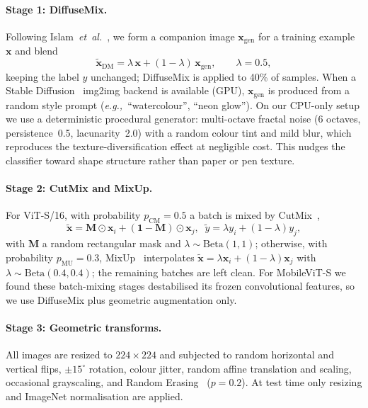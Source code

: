 \documentclass[10pt,twocolumn,letterpaper]{article}
\newcommand{\eg}{\textit{e.g.,}}
\newcommand{\etal}{\textit{et~al.}}
\begin{document}
\paragraph{Stage 1: DiffuseMix.}
Following Islam~\etal~\cite{diffusemix}, we form a companion image
$\mathbf{x}_{\text{gen}}$ for a training example $\mathbf{x}$ and blend
\begin{equation}
  \tilde{\mathbf{x}}_{\text{DM}} = \lambda\,\mathbf{x}
     + (1-\lambda)\,\mathbf{x}_{\text{gen}},\qquad \lambda=0.5,
  \label{eq:dm}
\end{equation}
keeping the label $y$ unchanged; DiffuseMix is applied to 40\% of samples.
When a Stable Diffusion~\cite{stablediffusion} img2img backend is available
(GPU), $\mathbf{x}_{\text{gen}}$ is produced from a random style prompt
(\eg\ ``watercolour'', ``neon glow''). On our CPU-only setup we use a
deterministic procedural generator: multi-octave fractal noise (6 octaves,
persistence~0.5, lacunarity~2.0) with a random colour tint and mild blur,
which reproduces the texture-diversification effect at negligible cost. This
nudges the classifier toward shape structure rather than paper or pen texture.

\paragraph{Stage 2: CutMix and MixUp.}
For ViT-S/16, with probability $p_{\text{CM}}=0.5$ a batch is mixed by
CutMix~\cite{cutmix},
\begin{equation}
  \tilde{\mathbf{x}} = \mathbf{M}\!\odot\!\mathbf{x}_i
      + (\mathbf{1}-\mathbf{M})\!\odot\!\mathbf{x}_j,\;\;
  \tilde{y}=\lambda y_i+(1-\lambda)y_j,
  \label{eq:cm}
\end{equation}
with $\mathbf{M}$ a random rectangular mask and
$\lambda\!\sim\!\mathrm{Beta}(1,1)$; otherwise, with probability
$p_{\text{MU}}=0.3$, MixUp~\cite{mixup} interpolates
$\tilde{\mathbf{x}}=\lambda\mathbf{x}_i+(1-\lambda)\mathbf{x}_j$ with
$\lambda\!\sim\!\mathrm{Beta}(0.4,0.4)$; the remaining batches are left clean.
For MobileViT-S we found these batch-mixing stages destabilised its frozen
convolutional features, so we use DiffuseMix plus geometric augmentation only.

\paragraph{Stage 3: Geometric transforms.}
All images are resized to $224\times224$ and subjected to random
horizontal and vertical flips, $\pm15^{\circ}$ rotation, colour jitter, random
affine translation and scaling, occasional grayscaling, and Random
Erasing~\cite{erasing} ($p{=}0.2$). At test time only resizing and ImageNet
normalisation are applied.
\end{document}

